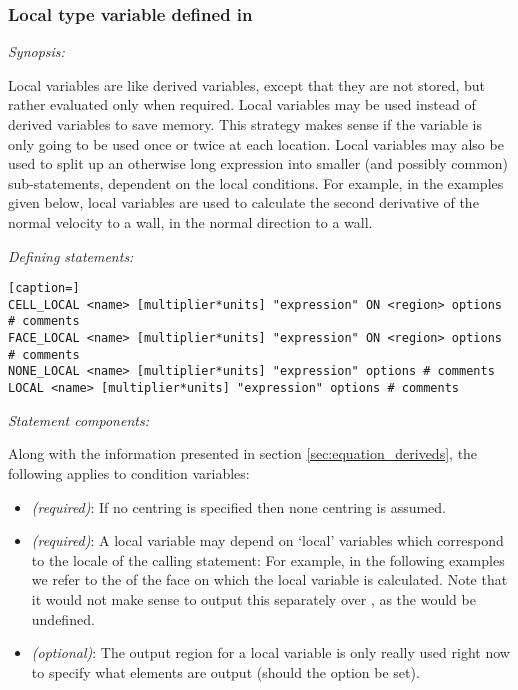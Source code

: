 \subsubsection{Local type variable defined in }

\emph{Synopsis:}

Local variables are like derived variables, except that they are not stored, but rather evaluated only when required.  Local variables may be used instead of derived variables to save memory.  This strategy makes sense if the variable is only going to be used once or twice at each location.  Local variables may also be used to split up an otherwise long expression into smaller (and possibly common) sub-statements, dependent on the local conditions.  For example, in the examples given below, local variables are used to calculate the second derivative of the normal velocity to a wall, in the normal direction to a wall.

\emph{Defining statements:}

\begin{lstlisting}[caption=]
CELL_LOCAL <name> [multiplier*units] "expression" ON <region> options # comments
FACE_LOCAL <name> [multiplier*units] "expression" ON <region> options # comments
NONE_LOCAL <name> [multiplier*units] "expression" options # comments
LOCAL <name> [multiplier*units] "expression" options # comments
\end{lstlisting}

\emph{Statement components:}

Along with the information presented in section \ref{sec:equation_deriveds}, the following applies to condition variables:

\begin{itemize}
\item {} \emph{(required)}:  If no centring is specified then none centring is assumed.
\item {} \emph{(required)}:  A local variable may depend on `local' variables which correspond to the locale of the calling statement:  For example, in the following examples we refer to the  of the face on which the local variable  is calculated.  Note that it would not make sense to output this  separately over , as the  would be undefined.
\item {} \emph{(optional)}:  The output region for a local variable is only really used right now to specify what elements are output (should the  option be set).
\end{itemize}

